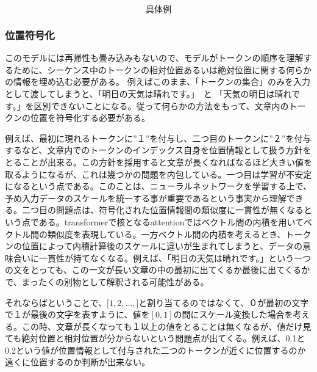 \begin{equation*}
  \text{具体例}
\end{equation*}


\subsubsection{位置符号化}



このモデルには再帰性も畳み込みもないので、モデルがトークンの順序を理解するために、シーケンス中のトークンの相対位置あるいは絶対位置に関する何らかの情報を埋め込む必要がある。
例えばこのまま、「トークンの集合」のみを入力として渡してしまうと、「明日の天気は晴れです。」　と 「天気の明日は晴れです。」を区別できないことになる。従って何らかの方法をもって、文章内のトークンの位置を符号化する必要がある。

例えば、最初に現れるトークンに”１”を付与し、二つ目のトークンに”２”を付与するなど、文章内でのトークンのインデックス自身を位置情報として扱う方針をとることが出来る。この方針を採用すると文章が長くなればなるほど大きい値を取るようになるが、これは幾つかの問題を内包している。一つ目は学習が不安定になるという点である。このことは、ニューラルネットワークを学習する上で、予め入力データのスケールを統一する事が重要であるという事実から理解できる。二つ目の問題点は、符号化された位置情報間の類似度に一貫性が無くなるという点である。transformerで核となるattentionではベクトル間の内積を用いてベクトル間の類似度を表現している。一方ベクトル間の内積を考えるとき、トークンの位置によって内積計算後のスケールに違いが生まれてしまうと、データの意味合いに一貫性が持てなくなる。例えば、「明日の天気は晴れです。」という一つの文をとっても、この一文が長い文章の中の最初に出てくるか最後に出てくるかで、まったくの別物として解釈される可能性がある。

それならばということで、$\lbrack1, 2, \ldots, \rbrack$と割り当てるのではなくて、０が最初の文字で１が最後の文字を表すように、値を$[0, 1]$の間にスケール変換した場合を考える。この時、文章が長くなっても１以上の値をとることは無くなるが、値だけ見ても絶対位置と相対位置が分からないという問題点が出てくる。例えば、0.1と0.2という値が位置情報として付与された二つのトークンが近くに位置するのか遠くに位置するのか判断が出来ない。

